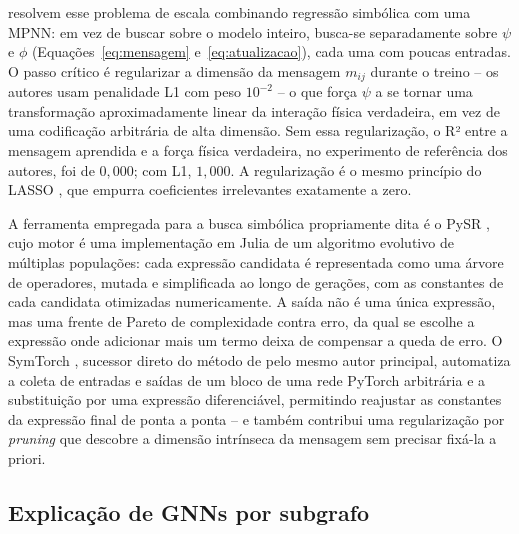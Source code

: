 \documentclass[
	article,		%
	12pt,			%
	oneside,
	a4paper,
	brazil
]{abntex2}
\begin{document}
 resolvem esse problema de escala combinando
regressão simbólica com uma MPNN: em vez de buscar sobre o modelo inteiro,
busca-se separadamente sobre $\psi$ e $\phi$ (Equações~\ref{eq:mensagem}
e~\ref{eq:atualizacao}), cada uma com poucas entradas. O passo crítico é
regularizar a dimensão da mensagem $m_{ij}$ durante o treino -- os autores
usam penalidade L1 com peso $10^{-2}$ -- o que força $\psi$ a se tornar uma
transformação aproximadamente linear da interação física verdadeira, em vez
de uma codificação arbitrária de alta dimensão. Sem essa regularização, o
R² entre a mensagem aprendida e a força física verdadeira, no experimento
de referência dos autores, foi de $0{,}000$; com L1, $1{,}000$. A
regularização é o mesmo princípio do LASSO \cite{tibshirani1996}, que
empurra coeficientes irrelevantes exatamente a zero.

A ferramenta empregada para a busca simbólica propriamente dita é o PySR
\cite{cranmer2023}, cujo motor é uma implementação em Julia de um algoritmo
evolutivo de múltiplas populações: cada expressão candidata é representada
como uma árvore de operadores, mutada e simplificada ao longo de gerações,
com as constantes de cada candidata otimizadas numericamente. A saída não é
uma única expressão, mas uma frente de Pareto de complexidade contra erro,
da qual se escolhe a expressão onde adicionar mais um termo deixa de
compensar a queda de erro. O SymTorch \cite{tan2026}, sucessor direto do
método de  pelo mesmo autor principal, automatiza a
coleta de entradas e saídas de um bloco de uma rede PyTorch arbitrária e a
substituição por uma expressão diferenciável, permitindo reajustar as
constantes da expressão final de ponta a ponta -- e também contribui uma
regularização por \textit{pruning} que descobre a dimensão intrínseca da
mensagem sem precisar fixá-la a priori.

\subsection{Explicação de GNNs por subgrafo}
\end{document}
